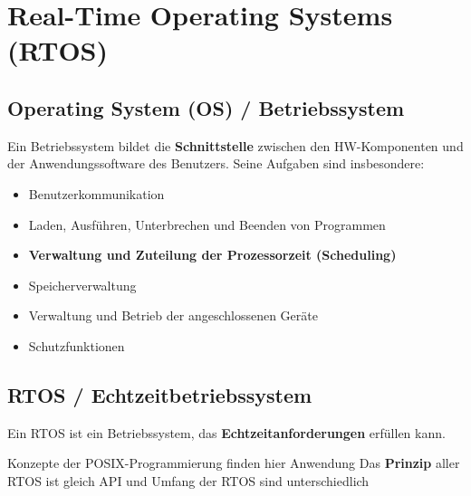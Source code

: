 \section{Real-Time Operating Systems (RTOS)}
\label{Real-Time Operating Systems (RTOS)}

\subsection{Operating System (OS) / Betriebssystem}

Ein Betriebssystem bildet die \textbf{Schnittstelle} zwischen den HW-Komponenten und der Anwendungssoftware des Benutzers.
Seine Aufgaben sind insbesondere:

\vspace{0.1cm}

\begin{minipage}[t]{0.58\columnwidth}
    \raggedright
    \begin{itemize}
        \item Benutzerkommunikation
        \item Laden, Ausführen, Unterbrechen und Beenden von Programmen
        \item \textbf{Verwaltung und Zuteilung der Prozessorzeit (Scheduling)}
    \end{itemize}
\end{minipage}
\hfill
\begin{minipage}[t]{0.38\columnwidth}
    \raggedright
    \begin{itemize}
        \item Speicherverwaltung
        \item Verwaltung und Betrieb der angeschlossenen Geräte
        \item Schutzfunktionen
    \end{itemize}
\end{minipage}


\subsection{RTOS / Echtzeitbetriebssystem}

Ein RTOS ist ein Betriebssystem, das \textbf{Echtzeitanforderungen} erfüllen kann.

\vspace{0.1cm}

\begin{outline}
    \1 Konzepte der POSIX-Programmierung finden hier Anwendung
    \1 Das \textbf{Prinzip} aller RTOS ist gleich
        \2 API und Umfang der RTOS sind unterschiedlich
\end{outline}


